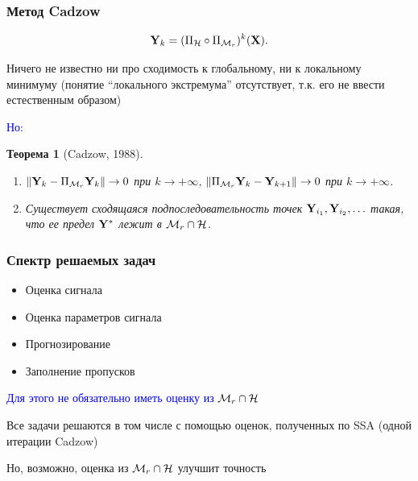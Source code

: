 \documentclass[unicode, notheorems]{beamer}
\newtheorem{theorem}{Теорема}
\begin{document}
\begin{frame}
	\frametitle{Метод Cadzow}
	\begin{equation*}
	\mathbf{Y}_k = (\Pi_{\mathcal{H}} \circ \Pi_{\mathcal{M}_r})^k (\mathbf{X}).
	\end{equation*}
	
	Ничего не известно ни про сходимость к глобальному, ни к локальному минимуму (понятие ``локального экстремума'' отсутствует, т.к. его не ввести естественным образом)

	\textcolor{blue}{Но:} 

	\begin{theorem}[Cadzow, 1988]
		\begin{enumerate}
			\item $\|\mathbf{Y}_k - \Pi_{\mathcal{M}_r} \mathbf{Y}_k\| \to 0$ при $k \to +\infty$, $\|\Pi_{\mathcal{M}_r}\mathbf{Y}_k - \mathbf{Y}_{k+1}\| \to 0$ при $k \to +\infty$.
			\item Существует сходящаяся подпоследовательность точек $\mathbf{Y}_{i_1}, \mathbf{Y}_{i_2}, \ldots$ такая, что ее предел $\mathbf{Y}^*$  лежит в $\mathcal{M}_r \cap \mathcal{H}$.
		\end{enumerate}
	\end{theorem}
\end{frame}

\begin{frame}
	\frametitle{Спектр решаемых задач}
	\begin{itemize}
		\item Оценка сигнала
		\item Оценка параметров сигнала
		\item Прогнозирование
		\item Заполнение пропусков
	\end{itemize}
	\vspace{0.4cm}
	\textcolor{blue}{Для этого не обязательно иметь оценку из $\mathcal{M}_r \cap \mathcal{H}$}
	
	Все задачи решаются в том числе с помощью оценок, полученных по SSA (одной итерации Cadzow)
	
	Но, возможно, оценка из $\mathcal{M}_r \cap \mathcal{H}$ улучшит точность
\end{frame}
\end{document}
